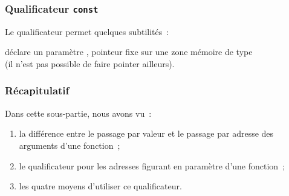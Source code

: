 \begin{frame}[fragile] \frametitle{Qualificateur {\tt const}}
Le qualificateur  permet quelques subtilités~:
\begin{center}
\end{center}
déclare un paramètre , \alert{pointeur fixe} sur une zone mémoire
de type  \\ (il n'est pas possible de faire pointer  ailleurs).
\bigskip

\begin{multicols}{2}
\begin{semiverbatim}\footnotesize
{}


\end{semiverbatim}
\end{multicols}
\end{frame}

\begin{frame}[fragile] \frametitle{Récapitulatif}
Dans cette sous-partie, nous avons vu~:

\begin{enumerate}
    \item la différence entre le passage par valeur et le passage par
    adresse des arguments d'une fonction~;
    \smallskip

    \item le qualificateur  pour les adresses figurant en
    paramètre d'une fonction~;
    \smallskip

    \item les quatre moyens d'utiliser ce qualificateur.
\end{enumerate}
\end{frame}

